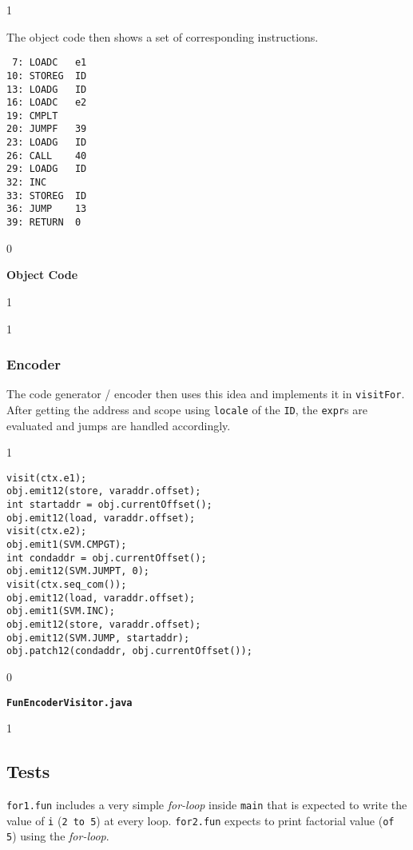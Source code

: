 \documentclass{article}
\newcommand{\code}[1]{\texttt{#1}}
\newenvironment{codelst}{\captionsetup{type=listing}}{}
\newcommand{\dividestages}{0}
\newcommand{\showobjectcode}{0}
\newcommand{\showencodecode}{1}
\newcommand{\npage}{
    \if\dividestages1
        \newpage
    \fi
}
\newcommand{\stage}[1]{
    \if\dividestages1
        \vspace{0.5cm}
        \subsection{#1}
    \fi
}
\newcommand{\act}[1]{
    \if\dividestages1
        \subsubsection{#1}
    \fi
}
\newcommand{\codecaption}[1]{
    \if\dividestages0
        \vspace{-0.75cm}
        \caption{\textbf{#1}}
        \vspace{0.4cm}
    \fi
}
\begin{document}
\if\showobjectcode1

\noindent The object code then shows a set of corresponding instructions.

\begin{codelst}
\begin{verbatim}
 7: LOADC   e1
10: STOREG  ID
13: LOADG   ID
16: LOADC   e2
19: CMPLT
20: JUMPF   39
23: LOADG   ID
26: CALL    40
29: LOADG   ID
32: INC
33: STOREG  ID
36: JUMP    13
39: RETURN  0
\end{verbatim}
\codecaption{Object Code}
\end{codelst}

\npage

\fi

\fi

\act{Encoder}

\vspace{0.5cm}

\noindent The code generator / encoder then uses this idea and implements it in \code{visitFor}. After getting the address and scope using \code{locale} of the \code{ID}, the \code{expr}s are evaluated and jumps are handled accordingly.

\if\showencodecode1

\vspace{0.5cm}

\begin{codelst}
\begin{verbatim}
visit(ctx.e1);
obj.emit12(store, varaddr.offset);
int startaddr = obj.currentOffset();
obj.emit12(load, varaddr.offset);
visit(ctx.e2);
obj.emit1(SVM.CMPGT);
int condaddr = obj.currentOffset();
obj.emit12(SVM.JUMPT, 0);
visit(ctx.seq_com());
obj.emit12(load, varaddr.offset);
obj.emit1(SVM.INC);
obj.emit12(store, varaddr.offset);
obj.emit12(SVM.JUMP, startaddr);
obj.patch12(condaddr, obj.currentOffset());
\end{verbatim}
\codecaption{\code{FunEncoderVisitor.java}}
\end{codelst}

\fi


\stage{Tests}

\noindent \code{for1.fun} includes a very simple \textit{for-loop} inside \code{main} that is expected to write the value of \code{i} (\code{2 to 5}) at every loop. \code{for2.fun} expects to print factorial value (\code{of 5}) using the \textit{for-loop}.
\end{document}
